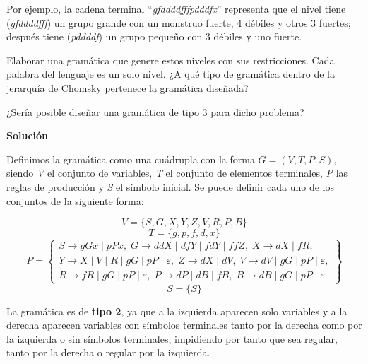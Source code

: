 \documentclass[11pt,a4paper]{article}
\newcommand{\sol}{\textbf{Solución}}
\begin{document}
		\footnotesize
	
		Por ejemplo, la cadena terminal “\textit{gfddddfffpdddfx}” representa que el nivel tiene
		(\textit{gfddddfff}) un grupo grande con un monstruo fuerte, 4 débiles y otros 3 fuertes; 
		después tiene (\textit{pddddf}) un grupo pequeño con 3 débiles y uno fuerte. \par
	
		\normalsize	
		Elaborar una gramática que genere estos niveles con sus restricciones. Cada palabra del 
		lenguaje es un solo nivel. ¿A qué tipo de gramática dentro de la jerarquía de Chomsky 
		pertenece la gramática diseñada? \par
	
		¿Sería posible diseñar una gramática de tipo 3 para dicho problema? \par
	
		\sol \par
		
		Definimos la gramática como una cuádrupla con la forma $G = (V, T, P, S)$, siendo \textit{V} el conjunto
		de variables, \textit{T} el conjunto de elementos terminales, \textit{P} las reglas de producción y
		\textit{S} el símbolo inicial. Se puede definir cada uno de los conjuntos de la siguiente forma: \par
		
		\[V = \lbrace S, G, X, Y, Z, V, R, P, B \rbrace \]
		\[T = \lbrace g, p, f, d, x \rbrace \]
		\[P = \left\{
		\begin{array}{c}
		S \rightarrow gGx \; | \; pPx, \;
		G \rightarrow ddX \; | \; dfY \; | \; fdY \; | \; ffZ, \;
		X \rightarrow dX \; | \; fR, \\
		Y \rightarrow X \; | \; V \; | \; R \; | \; gG \; | \; pP \; | \; \varepsilon, \;
		Z \rightarrow dX \; | \; dV, \;
		V \rightarrow dV \; | \; gG \; | \; pP \; | \; \varepsilon, \\
		R \rightarrow fR \; | \; gG \; | \; pP \; | \; \varepsilon, \;
		P \rightarrow dP \; | \; dB \; | \; fB, \;
		B \rightarrow dB \; | \; gG \; | \; pP \; | \; \varepsilon		
		\end{array}
		\right\}		
		\]
		\[S = \lbrace S \rbrace \]
		
		La gramática es de \textbf{tipo 2}, ya que a la izquierda aparecen solo variables y a la derecha aparecen
		variables con símbolos terminales tanto por la derecha como por la izquierda o sin símbolos terminales, 
		impidiendo por tanto que sea regular, tanto por la derecha o regular por la izquierda. \par
		
\end{document}
